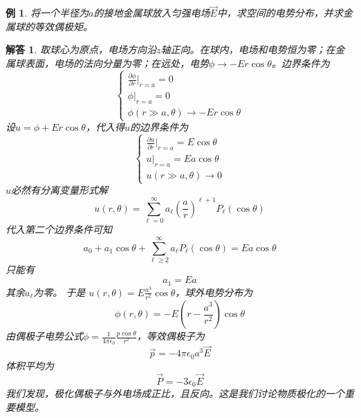 \documentclass[a4paper,11pt]{ctexbook}
\newtheorem{eg}{例}[section]
\newtheorem{ans}{解答}[section]
\newcommand{\beq}{\begin{equation}}
\newcommand{\eeq}{\end{equation}}
\newcommand{\epv}{\epsilon_0}
\newcommand{\pfrac}[2]{\frac{\partial #1}{\partial #2}}
\begin{document}
\begin{eg}
将一个半径为$a$的接地金属球放入匀强电场$\vec E$中，求空间的电势分布，并求金属球的等效偶极矩。
\end{eg}
\begin{ans}
取球心为原点，电场方向沿$z$轴正向。在球内，电场和电势恒为零；在金属球表面，电场的法向分量为零；在远处，电势$\phi \to - Er\cos \theta$。边界条件为
\beq
\begin{cases}
\pfrac{\phi}{r}\big|_{r=a} = 0 \\
\phi \big|_{r=a} = 0 \\
\phi(r\gg a,\theta) \to - Er\cos \theta
\end{cases}
\eeq
设$u = \phi + Er\cos \theta$，代入得$u$的边界条件为
\beq
\begin{cases}
\pfrac{u}{r}\big|_{r=a} = E \cos \theta \\
u\big|_{r=a} = Ea \cos \theta \\
u(r\gg a,\theta) \to 0
\end{cases}
\eeq
$u$必然有分离变量形式解
\beq
u(r,\theta) = \sum_{\ell = 0}^\infty a_\ell \left(\frac{a}{r}\right)^{\ell+1} P_\ell (\cos \theta)
\eeq
代入第二个边界条件可知
\beq
a_0 + a_1 \cos \theta + \sum_{\ell \geq 2}^\infty a_\ell  P_\ell (\cos \theta) =  Ea \cos \theta
\eeq
只能有
\beq
a_1 = Ea
\eeq
其余$a_\ell$为零。
于是
$u(r,\theta) = E \frac{a^3}{r^2} \cos \theta $，球外电势分布为
\beq
\phi(r,\theta) = -E\left( r - \frac{a^3}{r^2}\right) \cos \theta
\eeq
由偶极子电势公式$\phi = \frac{1}{4\pi \epv} \frac{p\cos \theta}{r^2}$，等效偶极子为
\beq
\vec p = -4\pi \epv a^3 \vec E
\eeq
体积平均为
\beq
\vec P = - 3 \epv \vec E
\eeq
我们发现，极化偶极子与外电场成正比，且反向。这是我们讨论物质极化的一个重要模型。
\end{ans}
\end{document}
